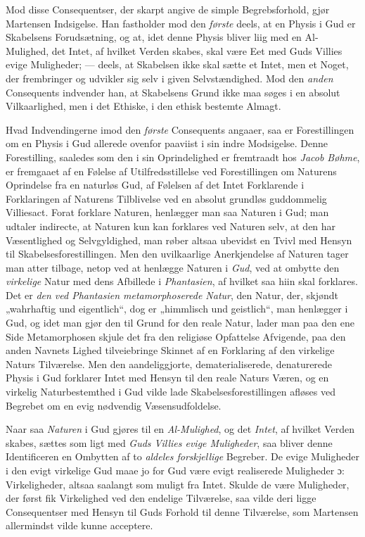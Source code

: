 \documentclass[12pt,a4paper]{book}
\newcommand{\opage}[1]{\marginnote{\footnotesize\textit{[#1]}}}
\begin{document}
Mod disse Consequentser, der skarpt angive de simple Begrebsforhold, gjør Martensen
Indsigelse. Han fastholder mod den \emph{første} deels, at en Physis i Gud er Skabelsens
Forudsætning, og at, idet denne Physis bliver liig med en Al-Mulighed, det Intet, af
hvilket Verden skabes, skal være \opage{76}Eet med Guds Villies evige Muligheder; --- deels,
at Skabelsen ikke skal sætte et Intet, men et Noget, der frembringer og udvikler sig
selv i given Selvstændighed. Mod den \emph{anden} Consequents indvender han, at Skabelsens
Grund ikke maa søges i en absolut Vilkaarlighed, men i det Ethiske, i den ethisk
bestemte Almagt.

Hvad Indvendingerne imod den \emph{første} Consequents angaaer, saa er Forestillingen om en
Physis i Gud allerede ovenfor paaviist i sin indre Modsigelse. Denne Forestilling,
saaledes som den i sin Oprindelighed er fremtraadt hos \emph{Jacob Bøhme}, er fremgaaet af
en Følelse af Utilfredsstillelse ved Forestillingen om Naturens Oprindelse fra en
naturløs Gud, af Følelsen af det Intet Forklarende i Forklaringen af Naturens
Tilblivelse ved en absolut grundløs guddommelig Villiesact. Forat forklare Naturen,
henlægger man saa Naturen i Gud; man udtaler indirecte, at Naturen kun kan forklares
ved Naturen selv, at den har Væsentlighed og Selvgyldighed, man røber altsaa ubevidst
en Tvivl med Hensyn til Skabelsesforestillingen. Men den uvilkaarlige Anerkjendelse
af Naturen tager man atter tilbage, netop ved at henlægge Naturen i \emph{Gud}, ved at
ombytte den \emph{virkelige} Natur med dens Afbillede i \emph{Phantasien}, af hvilket saa hiin skal
forklares. Det er \emph{den ved Phantasien metamorphoserede Natur}, den Natur, der, skjøndt
„wahrhaftig und eigentlich“, dog er „himmlisch und geistlich“, man henlægger i Gud,
og idet man gjør den til Grund for den reale Natur, lader man paa den ene Side
Metamorphosen skjule det fra den religiøse Opfattelse Afvigende, paa den anden
Navnets Lighed tilveiebringe Skinnet af en Forklaring af den virkelige Naturs
Tilværelse. Men den aandeliggjorte, dematerialiserede, denaturerede Physis i Gud
forklarer Intet med Hensyn til den reale Naturs Væren, og en virkelig
Naturbestemthed i Gud vilde lade Skabelsesforestillingen afløses ved Begrebet om en
evig nødvendig Væsensudfoldelse.

Naar saa \emph{Naturen} i Gud gjøres til en \emph{Al-Mulighed}, og det \emph{Intet}, af hvilket Verden
skabes, sættes som ligt med \emph{Guds Villies evige Muligheder}, saa bliver \opage{77}denne
Identificeren en Ombytten af to \emph{aldeles forskjellige} Begreber. De evige
Muligheder i den evigt virkelige Gud maae jo for Gud være evigt realiserede
Muligheder ɔ: Virkeligheder, altsaa saalangt som muligt fra Intet. Skulde de være
Muligheder, der først fik Virkelighed ved den endelige Tilværelse, saa vilde deri
ligge Consequentser med Hensyn til Guds Forhold til denne Tilværelse, som Martensen
allermindst vilde kunne acceptere.
\end{document}

